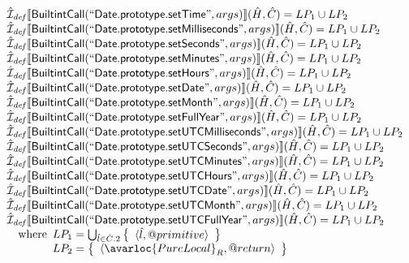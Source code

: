\[
\begin{array}{l}

\aI_{\it def}\lbr \SF{BuiltintCall}(``\SF{Date.prototype.setTime}",args)\rbr(\hat{H},\hat{C}) = LP_1 \cup LP_2\\
\aI_{\it def}\lbr \SF{BuiltintCall}(``\SF{Date.prototype.setMilliseconds}",args)\rbr(\hat{H},\hat{C}) = LP_1 \cup LP_2\\
\aI_{\it def}\lbr \SF{BuiltintCall}(``\SF{Date.prototype.setSeconds}",args)\rbr(\hat{H},\hat{C}) = LP_1 \cup LP_2\\
\aI_{\it def}\lbr \SF{BuiltintCall}(``\SF{Date.prototype.setMinutes}",args)\rbr(\hat{H},\hat{C}) = LP_1 \cup LP_2\\
\aI_{\it def}\lbr \SF{BuiltintCall}(``\SF{Date.prototype.setHours}",args)\rbr(\hat{H},\hat{C}) = LP_1 \cup LP_2\\
\aI_{\it def}\lbr \SF{BuiltintCall}(``\SF{Date.prototype.setDate}",args)\rbr(\hat{H},\hat{C}) = LP_1 \cup LP_2\\
\aI_{\it def}\lbr \SF{BuiltintCall}(``\SF{Date.prototype.setMonth}",args)\rbr(\hat{H},\hat{C}) = LP_1 \cup LP_2\\
\aI_{\it def}\lbr \SF{BuiltintCall}(``\SF{Date.prototype.setFullYear}",args)\rbr(\hat{H},\hat{C}) = LP_1 \cup LP_2\\
\aI_{\it def}\lbr \SF{BuiltintCall}(``\SF{Date.prototype.setUTCMilliseconds}",args)\rbr(\hat{H},\hat{C}) = LP_1 \cup LP_2\\
\aI_{\it def}\lbr \SF{BuiltintCall}(``\SF{Date.prototype.setUTCSeconds}",args)\rbr(\hat{H},\hat{C}) = LP_1 \cup LP_2\\
\aI_{\it def}\lbr \SF{BuiltintCall}(``\SF{Date.prototype.setUTCMinutes}",args)\rbr(\hat{H},\hat{C}) = LP_1 \cup LP_2\\
\aI_{\it def}\lbr \SF{BuiltintCall}(``\SF{Date.prototype.setUTCHours}",args)\rbr(\hat{H},\hat{C}) = LP_1 \cup LP_2\\
\aI_{\it def}\lbr \SF{BuiltintCall}(``\SF{Date.prototype.setUTCDate}",args)\rbr(\hat{H},\hat{C}) = LP_1 \cup LP_2\\
\aI_{\it def}\lbr \SF{BuiltintCall}(``\SF{Date.prototype.setUTCMonth}",args)\rbr(\hat{H},\hat{C}) = LP_1 \cup LP_2\\
\aI_{\it def}\lbr \SF{BuiltintCall}(``\SF{Date.prototype.setUTCFullYear}",args)\rbr(\hat{H},\hat{C}) = LP_1 \cup LP_2\\
\quad\wherec{
  LP_1 = \bigcup_{\hat{l} \in \hat{C}.2} \set{\langle \hat{l}, \varprop{primitive}\rangle}\\
  LP_2 = \set{\langle\avarloc{PureLocal}_R,\varprop{return}\rangle}\\
  }\\
\\

\end{array}
\]

